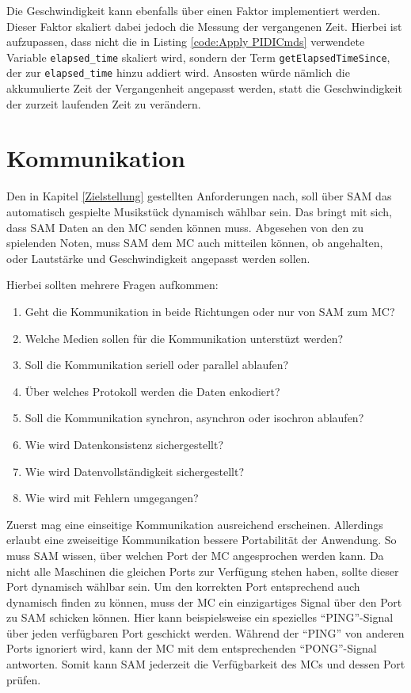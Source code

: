 Die Geschwindigkeit kann ebenfalls über einen Faktor implementiert werden.
Dieser Faktor skaliert dabei jedoch die Messung der vergangenen Zeit.
Hierbei ist aufzupassen, dass nicht die in Listing \ref{code:Apply PIDICmds} verwendete Variable \lstinline{elapsed_time} skaliert wird, sondern der Term \lstinline{getElapsedTimeSince}, der zur \lstinline{elapsed_time} hinzu addiert wird.
Ansosten würde nämlich die akkumulierte Zeit der Vergangenheit angepasst werden, statt die Geschwindigkeit der zurzeit laufenden Zeit zu verändern.


\section{Kommunikation} \label{vorgehenSW-SPPP}

Den in Kapitel \ref{Zielstellung} gestellten Anforderungen nach, soll über \ac{SAM} das automatisch gespielte Musikstück dynamisch wählbar sein.
Das bringt mit sich, dass \ac{SAM} Daten an den \ac{MC} senden können muss.
Abgesehen von den zu spielenden Noten, muss \ac{SAM} dem \ac{MC} auch mitteilen können, ob angehalten, oder Lautstärke und Geschwindigkeit angepasst werden sollen.

Hierbei sollten mehrere Fragen aufkommen:
\begin{enumerate}
    \item Geht die Kommunikation in beide Richtungen oder nur von \ac{SAM} zum \ac{MC}?
    \item Welche Medien sollen für die Kommunikation unterstüzt werden?
    \item Soll die Kommunikation seriell oder parallel ablaufen?
    \item Über welches Protokoll werden die Daten enkodiert?
    \item Soll die Kommunikation synchron, asynchron oder isochron ablaufen?
    \item Wie wird Datenkonsistenz sichergestellt?
    \item Wie wird Datenvollständigkeit sichergestellt?
    \item Wie wird mit Fehlern umgegangen?
\end{enumerate}

Zuerst mag eine einseitige Kommunikation ausreichend erscheinen.
Allerdings erlaubt eine zweiseitige Kommunikation bessere Portabilität der Anwendung.
So muss \ac{SAM} wissen, über welchen Port der \ac{MC} angesprochen werden kann.
Da nicht alle Maschinen die gleichen Ports zur Verfügung stehen haben, sollte dieser Port dynamisch wählbar sein.
Um den korrekten Port entsprechend auch dynamisch finden zu können, muss der \ac{MC} ein einzigartiges Signal über den Port zu \ac{SAM} schicken können.
Hier kann beispielsweise ein spezielles \enquote{PING}-Signal über jeden verfügbaren Port geschickt werden.
Während der \enquote{PING} von anderen Ports ignoriert wird, kann der \ac{MC} mit dem entsprechenden \enquote{PONG}-Signal antworten.
Somit kann \ac{SAM} jederzeit die Verfügbarkeit des \ac{MC}s und dessen Port prüfen.

